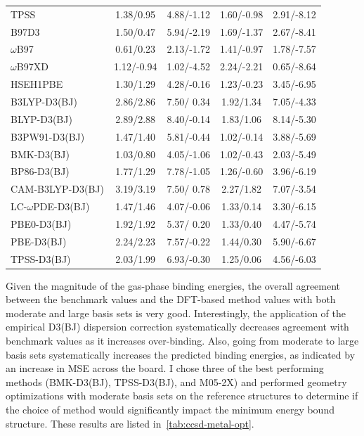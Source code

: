 \begin{doublespace}
\begin{longtable}[!htbp]{m{4cm} c c | c c}
TPSS\cite{Tao2003}   &  1.38/0.95 &  4.88/-1.12  &  1.60/-0.98 &  2.91/-8.12 \\
B97\cite{Becke1997}D3\cite{Grimme2010} &  1.50/0.47 &  5.94/-2.19  &  1.69/-1.37 &  2.67/-8.41 \\
$\omega$B97\cite{Chai2008a} &  0.61/0.23 &  2.13/-1.72  &  1.41/-0.97 &  1.78/-7.57 \\
$\omega$B97XD\cite{Chai2008} &  1.12/-0.94 &  1.02/-4.52  &  2.24/-2.21 &  0.65/-8.64 \\
HSEH1PBE\cite{Heyd2004, Heyd2005} &  1.30/1.29 &  4.28/-0.16  &  1.23/-0.23 &  3.45/-6.95 \\
B3LYP-D3(BJ)\cite{Grimme2010, Johnson2006} &  2.86/2.86 &  7.50/ 0.34  &  1.92/1.34 &  7.05/-4.33 \\
BLYP-D3(BJ)       &  2.89/2.88 &  8.40/-0.14  &  1.83/1.06 &  8.14/-5.30 \\
B3PW91-D3(BJ)     &  1.47/1.40 &  5.81/-0.44  &  1.02/-0.14 &  3.88/-5.69 \\
BMK-D3(BJ)        &  1.03/0.80 &  4.05/-1.06  &  1.02/-0.43 &  2.03/-5.49 \\
BP86-D3(BJ)       &  1.77/1.29 &  7.78/-1.05  &  1.26/-0.60 &  3.96/-6.19 \\
CAM-B3LYP-D3(BJ)  &  3.19/3.19 &  7.50/ 0.78  &  2.27/1.82 &  7.07/-3.54 \\
LC-$\omega$PDE-D3(BJ)& 1.47/1.46 & 4.07/-0.06 &  1.33/0.14 &  3.30/-6.15 \\
PBE0-D3(BJ)       &  1.92/1.92 &  5.37/ 0.20  &  1.33/0.40 &  4.47/-5.74 \\
PBE-D3(BJ)        &  2.24/2.23 &  7.57/-0.22  &  1.44/0.30 &  5.90/-6.67 \\
TPSS-D3(BJ)       &  2.03/1.99 &  6.93/-0.30  &  1.25/0.06 &  4.56/-6.03
\end{longtable}
\setlength\LTleft{0pt}
\setlength\LTright{0pt}

Given the magnitude of the gas-phase binding energies, the overall agreement
between the benchmark values and the DFT-based method values with both moderate
and large basis sets is very good. Interestingly, the application of the
empirical D3(BJ) dispersion correction systematically decreases agreement with
benchmark values as it increases over-binding. Also, going from moderate to
large basis sets systematically increases the predicted binding energies, as
indicated by an increase in MSE across the board. I chose three of the best
performing methods (BMK-D3(BJ), TPSS-D3(BJ), and M05-2X) and performed geometry
optimizations with moderate basis sets on the reference structures to determine
if the choice of method would significantly impact the minimum energy bound
structure. These results are listed in~\ref{tab:ccsd-metal-opt}.


\end{doublespace}
